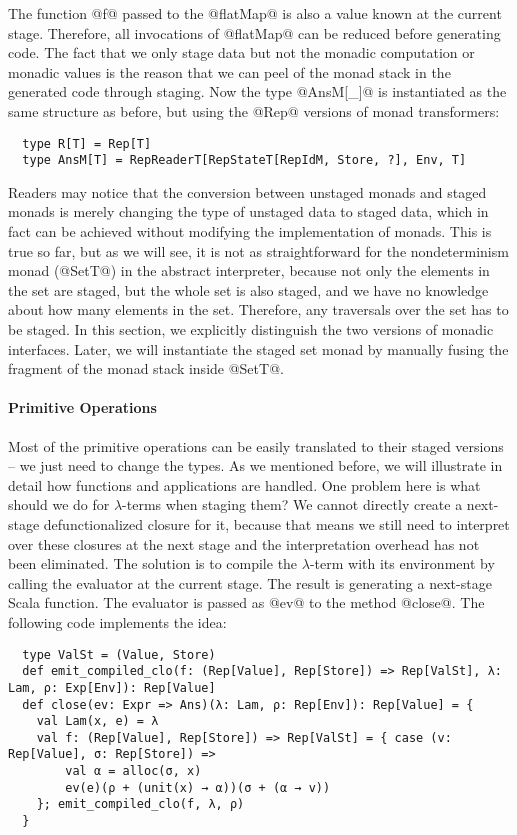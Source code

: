 The function @f@ passed to the @flatMap@ is also a value known at the current stage.
Therefore, all invocations of @flatMap@ can be reduced before generating code.
The fact that we only stage data but not the monadic computation or monadic
values is the reason that we can peel of the monad stack in the generated code
through staging.  Now the type @AnsM[_]@ is instantiated as the same structure
as before, but using the @Rep@ versions of monad transformers:
\begin{lstlisting}
  type R[T] = Rep[T]
  type AnsM[T] = RepReaderT[RepStateT[RepIdM, Store, ?], Env, T]
\end{lstlisting}

Readers may notice that the conversion between unstaged monads and staged monads
is merely changing the type of unstaged data to staged data, which in fact can
be achieved without modifying the implementation of monads. This is true so far,
but as we will see, it is not as straightforward for the nondeterminism monad
(@SetT@) in the abstract interpreter, because not only the elements in the set are
staged, but the whole set is also staged, and we have no knowledge about how
many elements in the set. Therefore, any traversals over the set has to be
staged.  In this section, we explicitly distinguish the two versions of monadic
interfaces. Later, we will instantiate the staged set monad by manually fusing
the fragment of the monad stack inside @SetT@.

\paragraph{Primitive Operations} Most of the primitive operations can be easily
translated to their staged versions -- we just need to change the types.  As we
mentioned before, we will illustrate in detail how functions and applications
are handled.  One problem here is what should we do for $\lambda$-terms when
staging them? We cannot directly create a next-stage defunctionalized closure
for it, because that means we still need to interpret over these closures at the
next stage and the interpretation overhead has not been eliminated. 
The solution is to compile the $\lambda$-term with its environment by calling
the evaluator at the current stage. The result is generating a next-stage
Scala function. The evaluator is passed as @ev@ to the method @close@.
The following code implements the idea:
\begin{lstlisting}
  type ValSt = (Value, Store)
  def emit_compiled_clo(f: (Rep[Value], Rep[Store]) => Rep[ValSt], λ: Lam, ρ: Exp[Env]): Rep[Value]
  def close(ev: Expr => Ans)(λ: Lam, ρ: Rep[Env]): Rep[Value] = {
    val Lam(x, e) = λ
    val f: (Rep[Value], Rep[Store]) => Rep[ValSt] = { case (v: Rep[Value], σ: Rep[Store]) =>
        val α = alloc(σ, x)
        ev(e)(ρ + (unit(x) → α))(σ + (α → v))
    }; emit_compiled_clo(f, λ, ρ)
  }
\end{lstlisting}

